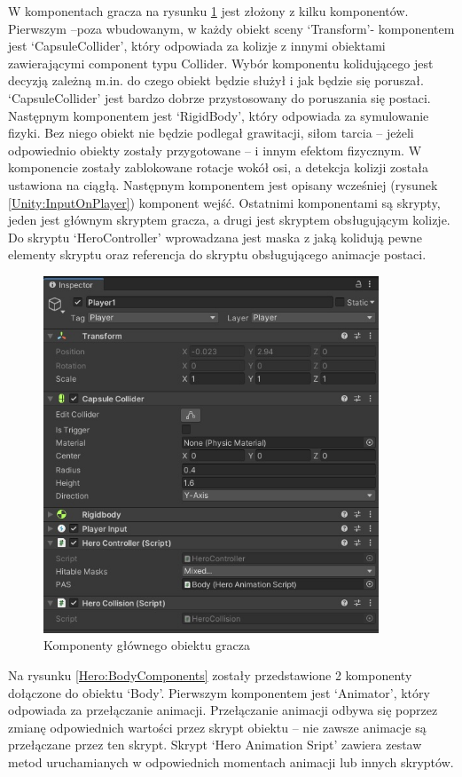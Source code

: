 \documentclass[12pt,twoside]{article}
\begin{document}
W komponentach gracza na rysunku \ref{Hero:Player1Components} jest złożony z
kilku komponentów. Pierwszym –poza wbudowanym, w każdy obiekt sceny `Transform'-
komponentem jest `CapsuleCollider', który odpowiada za kolizje z innymi
obiektami zawierającymi component typu Collider. Wybór komponentu kolidującego
jest decyzją zależną m.in. do czego obiekt będzie służył i jak będzie się
poruszał. `CapsuleCollider' jest bardzo dobrze przystosowany do poruszania się
postaci. Następnym komponentem jest `RigidBody', który odpowiada za symulowanie
fizyki. Bez niego obiekt nie będzie podlegał grawitacji, siłom tarcia -- jeżeli
odpowiednio obiekty zostały przygotowane -- i innym efektom fizycznym. W
komponencie zostały zablokowane rotacje wokół osi, a detekcja kolizji została
ustawiona na ciągłą. Następnym komponentem jest opisany wcześniej (rysunek
\ref{Unity:InputOnPlayer}) komponent wejść. Ostatnimi komponentami są skrypty,
jeden jest głównym skryptem gracza, a drugi jest skryptem obsługującym kolizje.
Do skryptu `HeroController' wprowadzana jest maska z jaką kolidują pewne
elementy skryptu oraz referencja do skryptu obsługującego animacje postaci. 

\begin{figure}[!ht]
    \centering
	\includegraphics[width=10cm]{RealizacjaProjektu/UnityPictires/Player1_Player1_components.jpg}
	\caption{Komponenty głównego obiektu gracza}
    \label{Hero:Player1Components}
\end{figure}

Na rysunku \ref{Hero:BodyComponents} zostały przedstawione 2 komponenty
dołączone do obiektu `Body'. Pierwszym komponentem jest `Animator', który
odpowiada za przełączanie animacji. Przełączanie animacji odbywa się poprzez
zmianę odpowiednich wartości przez skrypt obiektu -- nie zawsze animacje są
przełączane przez ten skrypt. Skrypt `Hero Animation Sript' zawiera zestaw metod
uruchamianych w odpowiednich momentach animacji lub innych skryptów. 
\end{document}
